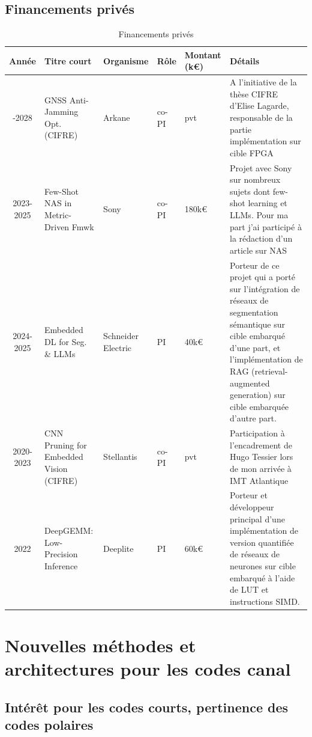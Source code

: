 \documentclass[11pt]{report}
\begin{document}
\begin{landscape}
\subsection{Financements privés}
{\small
\begin{longtable}{|c|l|p{3cm}|p{1cm}|p{1.5cm}|p{6.5cm}|}
\caption{Financements privés} \label{tab:financements_prives} \\
\hline
\textbf{Ann\'ee} & \textbf{Titre court} & \textbf{Organisme} & \textbf{R\^ole} & \textbf{Montant (k€)} & \textbf{Détails} \\
\hline
\endhead
\hline
\endfoot
\hline
\endlastfoot
2025-2028 & GNSS Anti-Jamming Opt. (CIFRE) & Arkane & co-PI & pvt &  A l'initiative de la thèse CIFRE d'Elise Lagarde, responsable de la partie implémentation sur cible FPGA\\
2023-2025 & Few-Shot NAS in Metric-Driven Fmwk & Sony & co-PI & 180k€ & Projet avec Sony sur nombreux sujets dont few-shot learning et LLMs. Pour ma part j'ai participé à la rédaction d'un article sur NAS\\
2024-2025 & Embedded DL for Seg. \& LLMs & Schneider Electric & PI & 40k€ & Porteur de ce projet qui a porté sur l'intégration de réseaux de segmentation sémantique sur cible embarqué d'une part, et l'implémentation de RAG (retrieval-augmented generation) sur cible embarquée d'autre part.\\
2020-2023 & CNN Pruning for Embedded Vision (CIFRE) & Stellantis & co-PI & pvt & Participation à l'encadrement de Hugo Tessier lors de mon arrivée à IMT Atlantique \\
2022 & DeepGEMM: Low-Precision Inference & Deeplite & PI & 60k€ &  Porteur et développeur principal d'une implémentation de version quantifiée de réseaux de neurones sur cible embarqué à l'aide de LUT et instructions SIMD.\\
\end{longtable}
}
\end{landscape}

\clearpage
\section{Nouvelles méthodes et architectures pour les codes canal}
\subsection{Intérêt pour les codes courts, pertinence des codes polaires}
\end{document}
